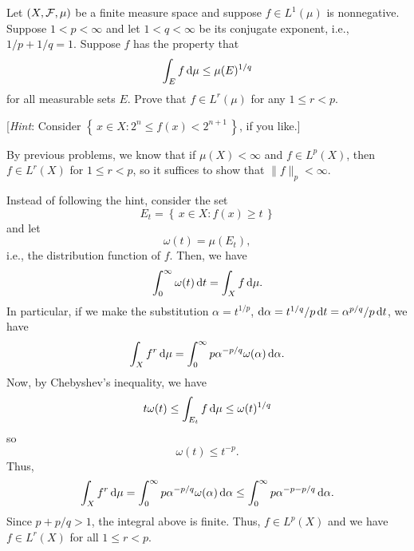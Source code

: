 \begin{problem}
  Let $(X,\mathcal{F},\mu)$ be a finite measure space and suppose $f\in L^1(\mu)$
  is nonnegative. Suppose $1<p<\infty$ and let $1<q<\infty$ be its
  conjugate exponent, i.e., $1/p+1/q=1$. Suppose $f$ has the property that
  \[
    \int_Ef\mathop{}\!\mathrm{d}\mu\leq \mu(E)^{1/q}
  \]
  for all measurable sets $E$. Prove that $f\in L^r(\mu)$ for any
  $1\leq r<p$.

  [\emph{Hint}: Consider $\left\{\,x\in X:2^n\leq f(x)<2^{n+1}\,\right\}$,
  if you like.]
\end{problem}
\begin{solution}
  By previous problems, we know that if $\mu(X)<\infty$ and $f\in L^p(X)$,
  then $f\in L^r(X)$ for $1\leq r<p$, so it suffices to show that
  $\|f\|_p<\infty$.

  Instead of following the hint, consider the set
  \[
    E_t=\left\{\,x\in X:f(x)\geq t\,\right\}
  \]
  and let
  \[
    \omega(t)=\mu\left(E_t\right),
  \]
  i.e., the distribution function of $f$. Then, we have
  \[
    \int_0^\infty\omega(t)\mathop{}\!\mathrm{d} t=\int_X f\mathop{}\!\mathrm{d}\mu.
  \]
  In particular, if we make the substitution $\alpha=t^{1/p}$,
  $\mathrm{d}\alpha=t^{1/q}/p\mathop{}\!\mathrm{d} t=\alpha^{p/q}/p\mathop{}\!\mathrm{d} t$, we have
  \[
    \int_X f^r\diff\mu=%
    \int_0^\infty p\alpha^{-p/q}\omega(\alpha)\diff\alpha.
  \]
  Now, by Chebyshev's inequality, we have
  \[
    t\omega(t)\leq\int_{E_t} f\mathop{}\!\mathrm{d}\mu\leq\omega(t)^{1/q}
  \]
  so
  \[
    \omega(t)\leq t^{-p}.
  \]
  Thus,
  \[
    \int_X f^r\diff\mu=%
    \int_0^\infty p\alpha^{-p/q}\omega(\alpha)\diff\alpha%
    \leq
    \int_0^\infty p\alpha^{-p-p/q}\diff\alpha.
  \]
  Since $p+p/q>1$, the integral above is finite. Thus, $f\in L^p(X)$ and we
  have $f\in L^r(X)$ for all $1\leq r<p$.
\end{solution}


